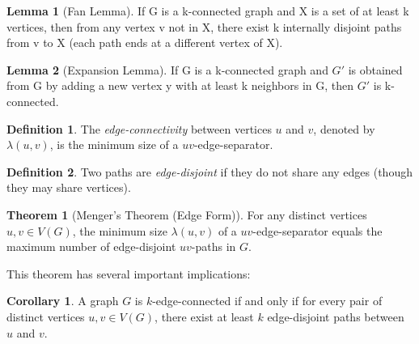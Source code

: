 \documentclass{article}
\theoremstyle{definition}
\newtheorem{theorem}{Theorem}
\newtheorem{lemma}{Lemma}
\newtheorem{corollary}{Corollary}
\newtheorem{definition}{Definition}
\begin{document}
\begin{lemma}[Fan Lemma]
If G is a k-connected graph and X is a set of at least k vertices, then from any vertex v not in X, there exist k internally disjoint paths from v to X (each path ends at a different vertex of X).
\end{lemma}

\begin{lemma}[Expansion Lemma]
If G is a k-connected graph and $G'$ is obtained from G by adding a new vertex y with at least k neighbors in G, then $G'$ is k-connected.
\end{lemma}

\begin{definition}
The \textit{edge-connectivity} between vertices $u$ and $v$, denoted by $\lambda(u,v)$, is the minimum size of a $uv$-edge-separator.
\end{definition}

\begin{definition}
Two paths are \textit{edge-disjoint} if they do not share any edges (though they may share vertices).
\end{definition}


\begin{theorem}[Menger's Theorem (Edge Form)]
For any distinct vertices $u,v \in V(G)$, the minimum size $\lambda(u,v)$ of a $uv$-edge-separator equals the maximum number of edge-disjoint $uv$-paths in $G$.
\end{theorem}

This theorem has several important implications:

\begin{corollary}
A graph $G$ is $k$-edge-connected if and only if for every pair of distinct vertices $u,v \in V(G)$, there exist at least $k$ edge-disjoint paths between $u$ and $v$.
\end{corollary}
\end{document}
